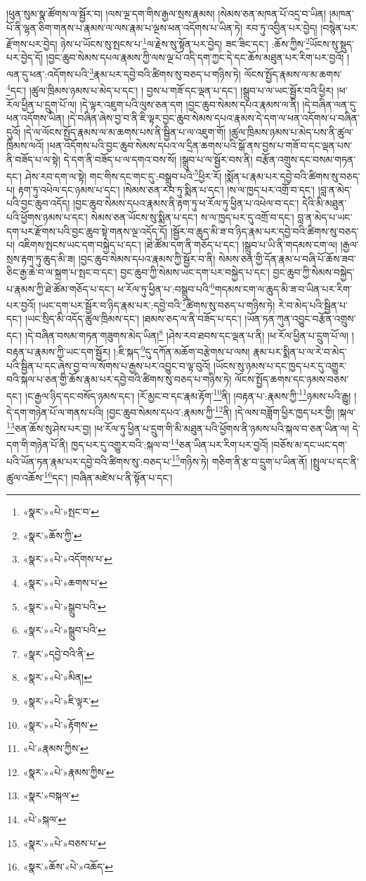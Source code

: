 །ཕུན་སུམ་སྣ་ཚོགས་ལ་སྦྱོར་བ། །ལས་ལྔ་དག་གིས་རྒྱལ་སྲས་རྣམས། །སེམས་ཅན་མཁན་པོ་འདྲ་བ་ཡིན། །མཁན་པོ་ནི་ལྷན་ཅིག་གནས་པ་རྣམས་ལ་ལས་རྣམ་པ་ལྔས་ཕན་འདོགས་པ་ཡིན་ཏེ། རབ་ཏུ་འབྱིན་པར་བྱེད། །བསྙེན་པར་རྫོགས་པར་བྱེད། ཉེས་པ་ཡོངས་སུ་སྤངས་པ་\footnote{«སྣར་»«པེ་»སྤང་བ་}ལ་རྗེས་སུ་སྟོན་པར་བྱེད། ཟང་ཟིང་དང་། :ཆོས་ཀྱིས་\footnote{«སྣར་»ཆོས་ཀྱི་}ཡོངས་སུ་སྡུད་པར་བྱེད་དོ། །བྱང་ཆུབ་སེམས་དཔལ་རྣམས་ཀྱི་ལས་ལྔ་པོ་འདི་དག་ཀྱང་དེ་དང་ཆོས་མཐུན་པར་རིག་པར་བྱའོ། །ལན་དུ་ཕན་:འདོགས་པའི་\footnote{«སྣར་»«པེ་»འདོགས་པ་}རྣམ་པར་དབྱེ་བའི་ཚིགས་སུ་བཅད་པ་གཉིས་ཏེ། ལོངས་སྤྱོད་རྣམས་ལ་མ་ཆགས་\footnote{«སྣར་»«པེ་»ཆགས་པ་}དང་། །ཚུལ་ཁྲིམས་ཉམས་པ་མེད་པ་དང་། །
བྱས་པ་གཟོ་དང་ལྡན་པ་དང་། །སྒྲུབ་པ་ལ་ཡང་སྦྱོར་བའི་ཕྱིར། །ཕ་རོལ་ཕྱིན་པ་དྲུག་པོ་ལ། །དེ་ལྟར་འཇུག་པའི་ལུས་ཅན་དག །བྱང་ཆུབ་སེམས་དཔའ་རྣམས་ལ་ནི། །དེ་བཞིན་ལན་དུ་ཕན་འདོགས་ཡིན། །དེ་བཞིན་ཞེས་བྱ་བ་ནི་ཇི་ལྟར་བྱང་ཆུབ་སེམས་དཔའ་རྣམས་དེ་དག་ལ་ཕན་འདོགས་པ་བཞིན་དུའོ། །དེ་ལ་ལོངས་སྤྱོད་རྣམས་ལ་མ་ཆགས་པས་ནི་སྦྱིན་པ་ལ་འཇུག་གོ། །ཚུལ་ཁྲིམས་ཉམས་པ་མེད་པས་ནི་ཚུལ་ཁྲིམས་ལའོ། །ཕན་འདོགས་པའི་བྱང་ཆུབ་སེམས་དཔའ་ལ་དྲིན་ཆགས་པའི་སྒོ་ནས་བྱས་པ་གཟོ་བ་དང་ལྡན་པས་ནི་བཟོད་པ་ལ་སྟེ། དེ་དག་ནི་བཟོད་པ་ལ་དགའ་བས་སོ། །སྒྲུབ་པ་ལ་སྦྱོར་བས་ནི། བརྩོན་འགྲུས་དང་བསམ་གཏན་དང་། ཤེས་རབ་དག་ལ་སྟེ། གང་གིས་དང་གང་དུ་:བསྒྲུབ་པའི་\footnote{«སྣར་»«པེ་»སྒྲུབ་པའི་}ཕྱིར་རོ། །སྨོན་པ་རྣམ་པར་དབྱེ་བའི་ཚིགས་སུ་བཅད་པ། རྟག་ཏུ་འཕེལ་དང་ཉམས་པ་དང་། །སེམས་ཅན་རབ་ཏུ་སྨིན་པ་དང་། །ས་ལ་ཁྱད་པར་འགྲོ་བ་དང་། །བླ་ན་མེད་པའི་བྱང་ཆུབ་འདོད། །བྱང་ཆུབ་སེམས་དཔའ་རྣམས་ནི་རྟག་ཏུ་ཕ་རོལ་ཏུ་ཕྱིན་པ་འཕེལ་བ་དང་། དེའི་མི་མཐུན་པའི་ཕྱོགས་ཉམས་པ་དང་། སེམས་ཅན་ཡོངས་སུ་སྨིན་པ་དང་། ས་ལ་ཁྱད་པར་དུ་འགྲོ་བ་དང་། བླ་ན་མེད་པ་ཡང་དག་པར་རྫོགས་པའི་བྱང་ཆུབ་སྟེ་གནས་ལྔ་འདོད་དོ། །སྦྱོར་བ་ཆུད་མི་ཟ་བ་ཉིད་རྣམ་པར་དབྱེ་བའི་ཚིགས་སུ་བཅད་པ། འཇིགས་སྤངས་ཡང་དག་བསྐྱེད་པ་དང་། །ཐེ་ཚོམ་དག་ནི་གཅོད་པ་དང་། །སྒྲུབ་པ་ཡི་ནི་གདམས་ངག་ལ། །རྒྱལ་སྲས་རྟག་ཏུ་ཆུད་མི་ཟ། །བྱང་ཆུབ་སེམས་དཔའ་རྣམས་ཀྱི་སྦྱོར་བ་ནི། སེམས་ཅན་གྱི་དོན་རྣམ་པ་བཞི་པོ་ཆོས་ཟབ་ཅིང་རྒྱ་ཆེ་བ་ལ་སྐྲག་པ་སྤང་བ་དང་། བྱང་ཆུབ་ཀྱི་སེམས་ཡང་དག་པར་བསྐྱེད་པ་དང་། བྱང་ཆུབ་ཀྱི་སེམས་བསྐྱེད་པ་རྣམས་ཀྱི་ཐེ་ཚོམ་གཅོད་པ་དང་། ཕ་རོལ་ཏུ་ཕྱིན་པ་:བསྒྲུབ་པའི་\footnote{«སྣར་»«པེ་»སྒྲུབ་པའི་}གདམས་ངག་ལ་ཆུད་མི་ཟ་བ་ཡིན་པར་རིག་པར་བྱའོ། །ཡང་དག་པར་སྦྱོར་བ་ཉིད་རྣམ་པར་:དབྱེ་བའི་\footnote{«སྣར་»དབྱེ་བའི་ནི་}ཚིགས་སུ་བཅད་པ་གཉིས་ཏེ། རེ་བ་མེད་པའི་སྦྱིན་པ་དང་། །ཡང་སྲིད་མི་འདོད་ཚུལ་ཁྲིམས་དང་། །ཐམས་ཅད་ལ་ནི་བཟོད་པ་དང་། །ཡོན་ཏན་ཀུན་འབྱུང་བརྩོན་འགྲུས་དང་། །དེ་བཞིན་བསམ་གཏན་གཟུགས་མེད་ཡིན།\footnote{«སྣར་»«པེ་»མིན།} །ཤེས་རབ་ཐབས་དང་ལྡན་པ་ནི། །ཕ་རོལ་ཕྱིན་པ་དྲུག་པོ་ལ། །བརྟན་པ་རྣམས་ཀྱི་ཡང་དག་སྦྱོར། །:ཇི་སྐད་\footnote{«སྣར་»«པེ་»ཇི་ལྟར་}དུ་དཀོན་མཆོག་བརྩེགས་པ་ལས། རྣམ་པར་སྨིན་པ་ལ་རེ་བ་མེད་པའི་སྦྱིན་པ་དང་ཞེས་བྱ་བ་ལ་སོགས་པ་རྒྱས་པར་འབྱུང་བ་ལྟ་བུའོ། །ཡོངས་སུ་ཉམས་པ་དང་ཁྱད་པར་དུ་འགྱུར་བའི་སྐལ་པ་ཅན་གྱི་ཆོས་རྣམ་པར་དབྱེ་བའི་ཚིགས་སུ་བཅད་པ་གཉིས་ཏེ། ལོངས་སྤྱོད་ཆགས་དང་ཉམས་བཅས་དང་། །ང་རྒྱལ་ཉིད་དང་བསོད་ཉམས་དང་། །རོ་མྱང་བ་དང་རྣམ་རྟོག་\footnote{«སྣར་»«པེ་»རྟོགས་}ནི། །བརྟན་པ་:རྣམས་ཀྱི་\footnote{«པེ་»རྣམས་ཀྱིས་}ཉམས་པའི་རྒྱུ། །དེ་དག་གཉེན་པོ་ལ་གནས་པའི། །བྱང་ཆུབ་སེམས་དཔའ་:རྣམས་ཀྱི་\footnote{«སྣར་»«པེ་»རྣམས་ཀྱིས་}ནི། །དེ་ལས་བཟློག་ཕྱིར་ཁྱད་པར་གྱི། །སྐལ་\footnote{«སྣར་»བསྐལ་}ཅན་ཆོས་སུ་ཤེས་པར་བྱ། །ཕ་རོལ་ཏུ་ཕྱིན་པ་དྲུག་གི་མི་མཐུན་པའི་ཕྱོགས་ནི་ཉམས་པའི་སྐལ་བ་ཅན་ཡིན་ལ། དེ་དག་གི་གཉེན་པོ་ནི། ཁྱད་པར་དུ་འགྱུར་བའི་:སྐལ་བ་\footnote{«པེ་»སྐལ་}ཅན་ཡིན་པར་རིག་པར་བྱའོ། །བཅོས་མ་དང་ཡང་དག་པའི་ཡོན་ཏན་རྣམ་པར་དབྱེ་བའི་ཚིགས་སུ་:བཅད་པ་\footnote{«སྣར་»«པེ་»བཅས་པ་}གཉིས་ཏེ། གཅིག་ནི་རྩ་བ་དྲུག་པ་ཡིན་ནོ། །སྤྲུལ་པ་དང་ནི་ཚུལ་འཆོས་\footnote{«སྣར་»ཆོས་«པེ་»འཆོད་}དང་། །བཞིན་མཛེས་པ་ནི་སྟོན་པ་དང་། 